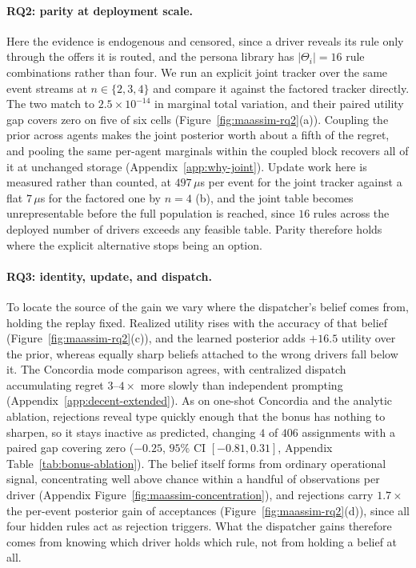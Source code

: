 \documentclass[letterpaper]{article} %
\begin{document}
\paragraph{RQ2: parity at deployment scale.} Here the evidence is endogenous and censored, since a driver reveals its rule only through the offers it is routed, and the persona library has $|\Theta_i|{=}16$ rule combinations rather than four. We run an explicit joint tracker over the same event streams at $n\in\{2,3,4\}$ and compare it against the factored tracker directly. The two match to $2.5{\times}10^{-14}$ in marginal total variation, and their paired utility gap covers zero on five of six cells (Figure~\ref{fig:maassim-rq2}(a)). Coupling the prior across agents makes the joint posterior worth about a fifth of the regret, and pooling the same per-agent marginals within the coupled block recovers all of it at unchanged storage (Appendix~\ref{app:why-joint}). Update work here is measured rather than counted, at $497\,\mu$s per event for the joint tracker against a flat $7\,\mu$s for the factored one by $n{=}4$ (b), and the joint table becomes unrepresentable before the full population is reached, since $16$ rules across the deployed number of drivers exceeds any feasible table. Parity therefore holds where the explicit alternative stops being an option.

\paragraph{RQ3: identity, update, and dispatch.} To locate the source of the gain we vary where the dispatcher's belief comes from, holding the replay fixed. Realized utility rises with the accuracy of that belief (Figure~\ref{fig:maassim-rq2}(c)), and the learned posterior adds $+16.5$ utility over the prior, whereas equally sharp beliefs attached to the wrong drivers fall below it. The Concordia mode comparison agrees, with centralized dispatch accumulating regret $3$--$4\times$ more slowly than independent prompting (Appendix~\ref{app:decent-extended}). As on one-shot Concordia and the analytic ablation, rejections reveal type quickly enough that the bonus has nothing to sharpen, so it stays inactive as predicted, changing $4$ of $406$ assignments with a paired gap covering zero ($-0.25$, $95\%$ CI $[-0.81,0.31]$, Appendix Table~\ref{tab:bonus-ablation}). The belief itself forms from ordinary operational signal, concentrating well above chance within a handful of observations per driver (Appendix Figure~\ref{fig:maassim-concentration}), and rejections carry $1.7\times$ the per-event posterior gain of acceptances (Figure~\ref{fig:maassim-rq2}(d)), since all four hidden rules act as rejection triggers. What the dispatcher gains therefore comes from knowing which driver holds which rule, not from holding a belief at all.
\end{document}
